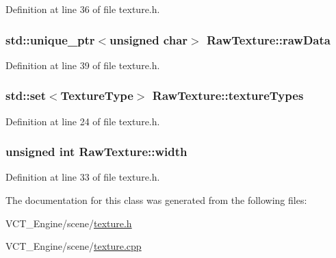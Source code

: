 Definition at line 36 of file texture.\+h.

\hypertarget{class_raw_texture_abe931dadd2a4b5bdbe82ee31f87ae60c}{}
\subsubsection[{raw\+Data}]{\setlength{\rightskip}{0pt plus 5cm}std\+::unique\+\_\+ptr$<$unsigned char$>$ Raw\+Texture\+::raw\+Data\hspace{0.3cm}{\ttfamily [protected]}}\label{class_raw_texture_abe931dadd2a4b5bdbe82ee31f87ae60c}


Definition at line 39 of file texture.\+h.

\hypertarget{class_raw_texture_a41f22696466ec5f4996f0f4dccc7e5e0}{}
\subsubsection[{texture\+Types}]{\setlength{\rightskip}{0pt plus 5cm}std\+::set$<${\bf Texture\+Type}$>$ Raw\+Texture\+::texture\+Types}\label{class_raw_texture_a41f22696466ec5f4996f0f4dccc7e5e0}


Definition at line 24 of file texture.\+h.

\hypertarget{class_raw_texture_a8db9a3ed2c3851077b13b881db99232c}{}
\subsubsection[{width}]{\setlength{\rightskip}{0pt plus 5cm}unsigned int Raw\+Texture\+::width\hspace{0.3cm}{\ttfamily [protected]}}\label{class_raw_texture_a8db9a3ed2c3851077b13b881db99232c}


Definition at line 33 of file texture.\+h.



The documentation for this class was generated from the following files\+:\begin{DoxyCompactItemize}
\item 
V\+C\+T\+\_\+\+Engine/scene/\hyperlink{texture_8h}{texture.\+h}\item 
V\+C\+T\+\_\+\+Engine/scene/\hyperlink{texture_8cpp}{texture.\+cpp}\end{DoxyCompactItemize}
